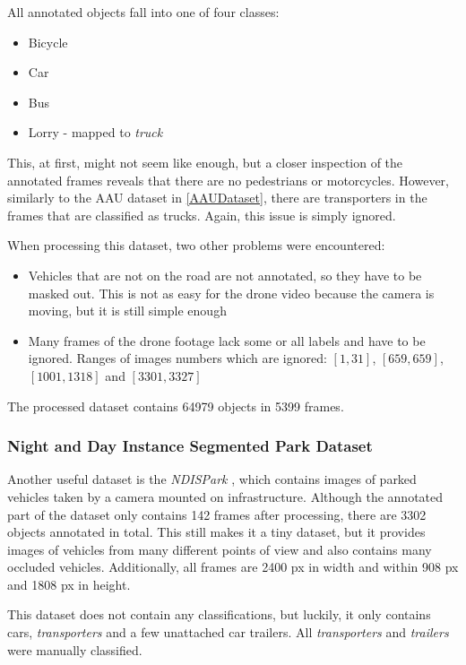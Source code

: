 All annotated objects fall into one of four classes:
\begin{itemize}
    \item Bicycle
    \item Car
    \item Bus
    \item Lorry - mapped to \textit{truck}
\end{itemize}
This, at first, might not seem like enough, but a closer inspection of the
annotated frames reveals that there are no pedestrians or motorcycles. However,
similarly to the AAU dataset in \autoref{AAUDataset}, there are transporters in the frames
that are classified as trucks. Again, this issue is simply ignored.

When processing this dataset, two other problems were encountered:
\begin{itemize}
    \item Vehicles that are not on the road are not annotated, so they have to
    be masked out. This is not as easy for the drone video because the camera is
    moving, but it is still simple enough
    \item Many frames of the drone footage lack some or all labels and have to
    be ignored. Ranges of images numbers which are ignored: $[1,31]$,
    $[659,659]$, $[1001,1318]$ and $[3301,3327]$
\end{itemize}
The processed dataset contains \num{64979} objects in \num{5399} frames.


\subsubsection*{Night and Day Instance Segmented Park Dataset}

Another useful dataset is the \textit{NDISPark} \cite{Luca2022}, which contains
images of parked vehicles taken by a camera mounted on infrastructure. Although
the annotated part of the dataset only contains \num{142} frames after
processing, there are \num{3302} objects annotated in total. This still makes it
a tiny dataset, but it provides images of vehicles from many different points of
view and also contains many occluded vehicles. 
Additionally, all frames are \num{2400} px in width and within \num{908} px and
\num{1808} px in height.

This dataset does not contain any classifications, but luckily, it only contains
cars, \textit{transporters} and a few unattached car trailers. All
\textit{transporters} and \textit{trailers} were manually classified.


